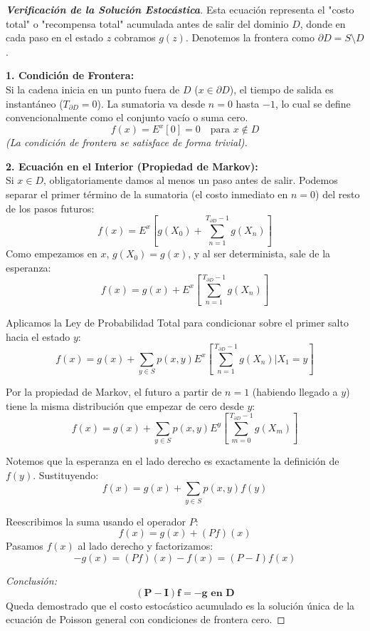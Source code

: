 \documentclass[10pt,a4paper]{article}
\begin{document}
\begin{proof}[\textbf{Verificación de la Solución Estocástica}]
    Esta ecuación representa el "costo total" o "recompensa total" acumulada antes de salir del dominio $D$, donde en cada paso en el estado $z$ cobramos $g(z)$. Denotemos la frontera como $\partial D = S \setminus D$.

    \textbf{1. Condición de Frontera:} \\
    Si la cadena inicia en un punto fuera de $D$ ($x \in \partial D$), el tiempo de salida es instantáneo ($T_{\partial D} = 0$). 
    La sumatoria va desde $n=0$ hasta $-1$, lo cual se define convencionalmente como el conjunto vacío o suma cero. 
    \[ f(x) = E^x[0] = 0 \quad \text{para } x \notin D \]
    \textit{(La condición de frontera se satisface de forma trivial).}

    \textbf{2. Ecuación en el Interior (Propiedad de Markov):} \\
    Si $x \in D$, obligatoriamente damos al menos un paso antes de salir. Podemos separar el primer término de la sumatoria (el costo inmediato en $n=0$) del resto de los pasos futuros:
    \[ f(x) = E^x \left[ g(X_0) + \sum_{n=1}^{T_{\partial D} - 1} g(X_n) \right] \]
    Como empezamos en $x$, $g(X_0) = g(x)$, y al ser determinista, sale de la esperanza:
    \[ f(x) = g(x) + E^x \left[ \sum_{n=1}^{T_{\partial D} - 1} g(X_n) \right] \]
    
    Aplicamos la Ley de Probabilidad Total para condicionar sobre el primer salto hacia el estado $y$:
    \[ f(x) = g(x) + \sum_{y \in S} p(x,y) E^x \left[ \sum_{n=1}^{T_{\partial D} - 1} g(X_n) \mathrel{\Big|} X_1 = y \right] \]
    
    Por la propiedad de Markov, el futuro a partir de $n=1$ (habiendo llegado a $y$) tiene la misma distribución que empezar de cero desde $y$:
    \[ f(x) = g(x) + \sum_{y \in S} p(x,y) E^y \left[ \sum_{m=0}^{T_{\partial D} - 1} g(X_m) \right] \]
    
    Notemos que la esperanza en el lado derecho es exactamente la definición de $f(y)$. Sustituyendo:
    \[ f(x) = g(x) + \sum_{y \in S} p(x,y) f(y) \]
    
    Reescribimos la suma usando el operador $P$:
    \[ f(x) = g(x) + (Pf)(x) \]
    Pasamos $f(x)$ al lado derecho y factorizamos:
    \[ -g(x) = (Pf)(x) - f(x) = (P - I)f(x) \]
    
    \textit{Conclusión:} \[ \mathbf{(P - I)f = -g \text{ en } D} \]
    Queda demostrado que el costo estocástico acumulado es la solución única de la ecuación de Poisson general con condiciones de frontera cero.
\end{proof}
\end{document}

